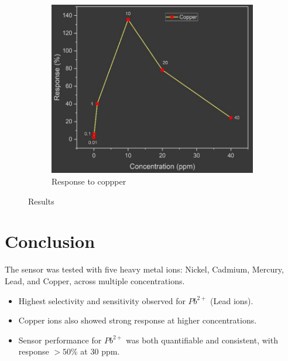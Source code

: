\documentclass[11pt,a5paper]{article}
\begin{document}
\begin{figure}[t]
    \begin{subfigure}[b]{0.325\textwidth}
        \centering
        \includegraphics[width=\linewidth]{copper_ion.png}
        \caption{Response to coppper}
    \end{subfigure}
    \caption{Results}
    \label{fig:results}
\end{figure}

\vspace{-1.5em}
\section{Conclusion}
The sensor was tested with five heavy metal ions: 
Nickel, Cadmium, Mercury, Lead, and Copper, across multiple concentrations.
\begin{itemize}
    \item Highest selectivity and sensitivity observed for $Pb^{2+}$ (Lead ions).
    \item Copper ions also showed strong response at higher concentrations.
    \item Sensor performance for $Pb^{2+}$ was both quantifiable and consistent, with response $>50\%$ at 30 ppm.
\end{itemize}
\end{document}
